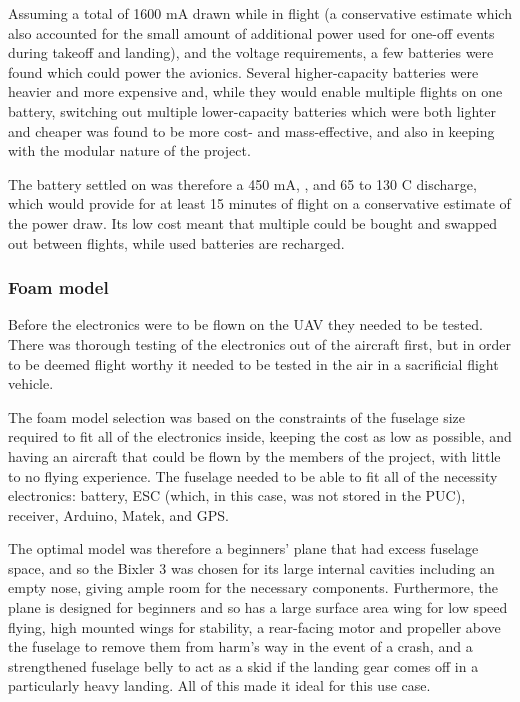 \documentclass[../../main.tex]{subfiles}
\begin{document}
Assuming a total of 1600 mA drawn while in flight (a conservative estimate which also accounted for the small amount of additional power used for one-off events during takeoff and landing), and the voltage requirements, a few batteries were found which could power the avionics.
Several higher-capacity batteries were heavier and more expensive and, while they would enable multiple flights on one battery, switching out multiple lower-capacity batteries which were both lighter and cheaper was found to be more cost- and mass-effective, and also in keeping with the modular nature of the project. 

The battery settled on was therefore a 450 mA, , and 65 to 130 C discharge, which would provide for at least 15 minutes of flight on a conservative estimate of the power draw.
Its low cost meant that multiple could be bought and swapped out between flights, while used batteries are recharged.

\subsubsection{Foam model} \label{sec:design-process:revised-design:electronics:foam-model}


Before the electronics were to be flown on the UAV they needed to be tested.
There was thorough testing of the electronics out of the aircraft first, but in order to be deemed flight worthy it needed to be tested in the air in a sacrificial flight vehicle.

The foam model selection was based on the constraints of the fuselage size required to fit all of the electronics inside, keeping the cost as low as possible, and having an aircraft that could be flown by the members of the project, with little to no flying experience.
The fuselage needed to be able to fit all of the necessity electronics: battery, ESC (which, in this case, was not stored in the PUC), receiver, Arduino, Matek, and GPS.

The optimal model was therefore a beginners' plane that had excess fuselage space, and so the Bixler 3 was chosen for its large internal cavities including an empty nose, giving ample room for the necessary components.
Furthermore, the plane is designed for beginners and so has a large surface area wing for low speed flying, high mounted wings for stability, a rear-facing motor and propeller above the fuselage to remove them from harm's way in the event of a crash, and a strengthened fuselage belly to act as a skid if the landing gear comes off in a particularly heavy landing.
All of this made it ideal for this use case.
\end{document}
